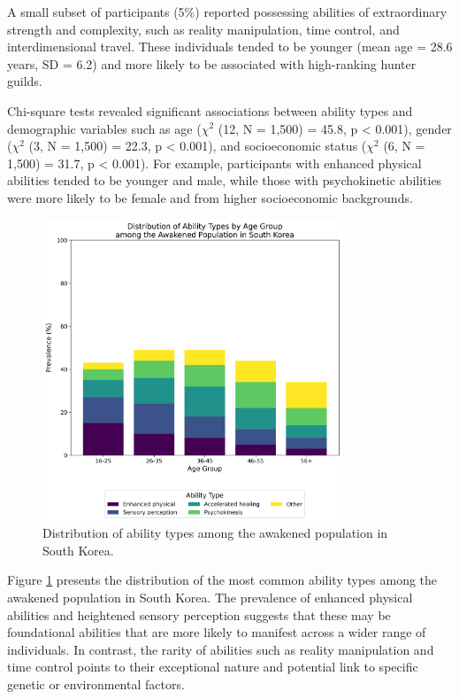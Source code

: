 \documentclass[12pt, a4paper]{article}
\begin{document}
A small subset of participants (5\%) reported possessing abilities of extraordinary strength and complexity, such as reality manipulation, time control, and interdimensional travel. These individuals tended to be younger (mean age = 28.6 years, SD = 6.2) and more likely to be associated with high-ranking hunter guilds.

Chi-square tests revealed significant associations between ability types and demographic variables such as age ($\chi^2$ (12, N = 1,500) = 45.8, p < 0.001), gender ($\chi^2$ (3, N = 1,500) = 22.3, p < 0.001), and socioeconomic status ($\chi^2$ (6, N = 1,500) = 31.7, p < 0.001). For example, participants with enhanced physical abilities tended to be younger and male, while those with psychokinetic abilities were more likely to be female and from higher socioeconomic backgrounds.

\begin{figure}[h]
    \centering
    \includegraphics[width=0.8\textwidth]{ability_distribution.png}
    \caption{Distribution of ability types among the awakened population in South Korea.}
    \label{fig:ability_dist}
\end{figure}

Figure \ref{fig:ability_dist} presents the distribution of the most common ability types among the awakened population in South Korea. The prevalence of enhanced physical abilities and heightened sensory perception suggests that these may be foundational abilities that are more likely to manifest across a wider range of individuals. In contrast, the rarity of abilities such as reality manipulation and time control points to their exceptional nature and potential link to specific genetic or environmental factors.
\end{document}
